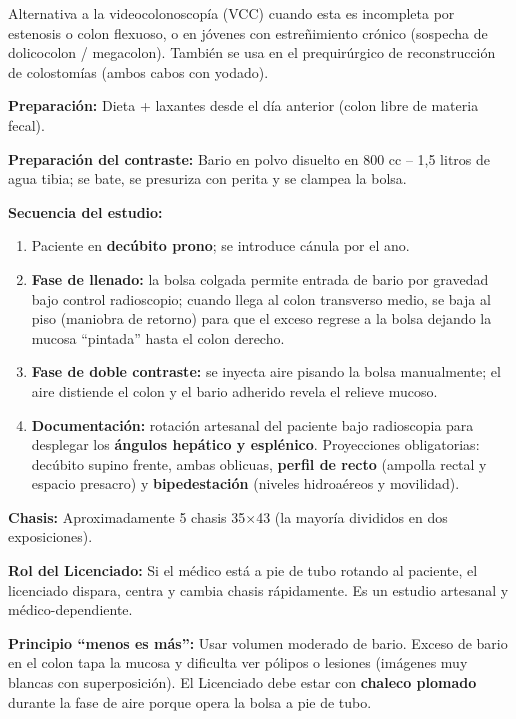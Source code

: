 Alternativa a la videocolonoscopía (VCC) cuando esta es incompleta por estenosis o colon flexuoso, o en jóvenes con estreñimiento crónico (sospecha de dolicocolon / megacolon). También se usa en el prequirúrgico de reconstrucción de colostomías (ambos cabos con yodado).

\textbf{Preparación:} Dieta + laxantes desde el día anterior (colon libre de materia fecal).

\textbf{Preparación del contraste:} Bario en polvo disuelto en 800 cc -- 1,5 litros de agua tibia; se bate, se presuriza con perita y se clampea la bolsa.

\textbf{Secuencia del estudio:}
\begin{enumerate}[noitemsep]
	\item Paciente en \textbf{decúbito prono}; se introduce cánula por el ano.
	\item \textbf{Fase de llenado:} la bolsa colgada permite entrada de bario por gravedad bajo control radioscopio; cuando llega al colon transverso medio, se baja al piso (maniobra de retorno) para que el exceso regrese a la bolsa dejando la mucosa ``pintada'' hasta el colon derecho.
	\item \textbf{Fase de doble contraste:} se inyecta aire pisando la bolsa manualmente; el aire distiende el colon y el bario adherido revela el relieve mucoso.
	\item \textbf{Documentación:} rotación artesanal del paciente bajo radioscopia para desplegar los \textbf{ángulos hepático y esplénico}. Proyecciones obligatorias: decúbito supino frente, ambas oblicuas, \textbf{perfil de recto} (ampolla rectal y espacio presacro) y \textbf{bipedestación} (niveles hidroaéreos y movilidad).
\end{enumerate}

\textbf{Chasis:} Aproximadamente 5 chasis 35$\times$43 (la mayoría divididos en dos exposiciones).

\textbf{Rol del Licenciado:} Si el médico está a pie de tubo rotando al paciente, el licenciado dispara, centra y cambia chasis rápidamente. Es un estudio artesanal y médico-dependiente.\\

\begin{cajakeypoints}
	\textbf{Principio ``menos es más'':} Usar volumen moderado de bario. Exceso de bario en el colon tapa la mucosa y dificulta ver pólipos o lesiones (imágenes muy blancas con superposición). El Licenciado debe estar con \textbf{chaleco plomado} durante la fase de aire porque opera la bolsa a pie de tubo.
\end{cajakeypoints}

